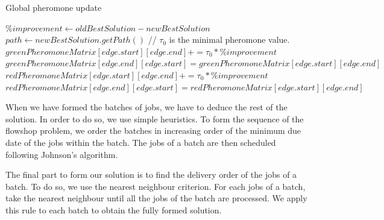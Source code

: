 \documentclass[UTF8, twoside]{EPURapport}
\begin{document}
\begin{algorithm}
	\caption{Global pheromone update}
	\begin{algorithmic}[1]
		\State $\%improvement \gets oldBestSolution - newBestSolution$
		\State $path \gets newBestSolution.getPath()$
				\State // $\tau_0$ is the minimal pheromone value.
				\State $greenPheromoneMatrix[edge.start][edge.end] += \tau_0 * \%improvement$
				\State $greenPheromoneMatrix[edge.end][edge.start] = greenPheromoneMatrix[edge.start][edge.end]$
			\Else
				\State $redPheromoneMatrix[edge.start][edge.end] += \tau_0 * \%improvement$	
				\State $redPheromoneMatrix[edge.end][edge.start] = redPheromoneMatrix[edge.start][edge.end]$
			\EndIf
		\EndFor
	\end{algorithmic}
	\label{global_update}  	  
\end{algorithm}

\clearpage

	When we have formed the batches of jobs, we have to deduce the rest of the solution. In order to do so, we use simple heuristics. To form the sequence of the flowshop problem, we order the batches in increasing order of the minimum due date of the jobs within the batch. The jobs of a batch are then scheduled following Johnson's algorithm.
	
	The final part to form our solution is to find the delivery order of the jobs of a batch. To do so, we use the nearest neighbour criterion. For each jobs of a batch, take the nearest neighbour until all the jobs of the batch are processed. We apply this rule to each batch to obtain the fully formed solution.
\end{document}
